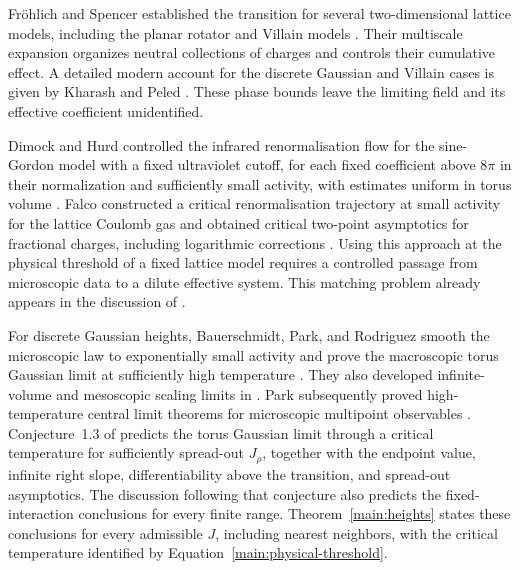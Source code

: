 Fr\"ohlich and Spencer established the transition for several
two-dimensional lattice models, including the planar rotator and
Villain models \citep{FrohlichSpencer1981}.  Their multiscale expansion
organizes neutral collections of charges and controls their cumulative
effect.  A detailed modern account for the discrete Gaussian and Villain
cases is given by Kharash and Peled \citep{KharashPeled2017}.
These phase bounds leave the limiting field and its effective coefficient
unidentified.

Dimock and Hurd controlled the infrared renormalisation flow for the
sine-Gordon model with a fixed ultraviolet cutoff, for each fixed
coefficient above $8\pi$ in their normalization and sufficiently small
activity, with estimates uniform in torus volume
\citep{DimockHurd2000}.  Falco constructed a critical renormalisation
trajectory at small activity for the lattice Coulomb gas and obtained
critical two-point asymptotics for fractional charges, including
logarithmic corrections \citep{Falco2012,Falco2013}.  Using this
approach at the physical threshold of a fixed lattice model requires a
controlled passage from microscopic data to a dilute effective system.
This matching problem already appears in the discussion of
\citet{KosterlitzThouless1973}.

For discrete Gaussian heights, Bauerschmidt, Park, and Rodriguez
smooth the microscopic law to exponentially small activity and prove
the macroscopic torus Gaussian limit at sufficiently high temperature
\citep{BPR2024I}.  They also developed infinite-volume and mesoscopic
scaling limits in \citet{BPR2024II}.  Park subsequently
proved high-temperature central limit theorems for microscopic
multipoint observables \citep{Park2025Multipoint}.
Conjecture~1.3 of \citet{BPR2024I} predicts the torus Gaussian limit
through a critical temperature for sufficiently spread-out $J_\rho$,
together with the endpoint value, infinite right slope,
differentiability above the transition, and spread-out asymptotics.
The discussion following that conjecture also predicts the
fixed-interaction conclusions for every finite range.
Theorem~\ref{main:heights} states these conclusions for every admissible
$J$, including nearest neighbors, with the critical temperature
identified by Equation~\eqref{main:physical-threshold}.

